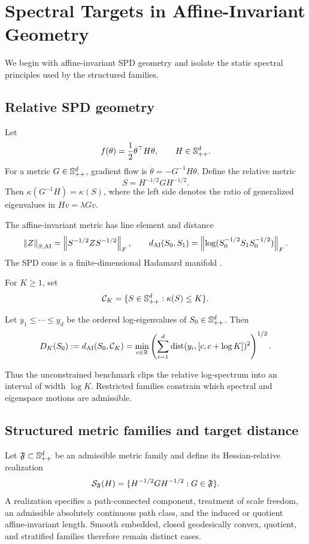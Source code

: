 \section{Spectral Targets in Affine-Invariant Geometry}
\label{sec:information-rdgc}

We begin with affine-invariant SPD geometry and isolate the static spectral
principles used by the structured families.

\subsection{Relative SPD geometry}

Let
\[
  f(\theta)=\frac12\theta^\top H\theta,
  \qquad H\in\mathbb S_{++}^d.
\]
For a metric \(G\in\mathbb S_{++}^d\), gradient flow is
\(\dot\theta=-G^{-1}H\theta\).  Define the relative metric
\[
  S=H^{-1/2}GH^{-1/2}.
\]
Then \(\kappa(G^{-1}H)=\kappa(S)\), where the left side denotes the ratio of
generalized eigenvalues in \(Hv=\lambda Gv\).

The affine-invariant metric has line element and distance
\[
  \left\lVert Z\right\rVert_{S,\mathrm{AI}}
  =\left\lVert S^{-1/2}ZS^{-1/2}\right\rVert_F,
  \qquad
  d_{\mathrm{AI}}(S_0,S_1)
  =\left\lVert \log(S_0^{-1/2}S_1S_0^{-1/2})\right\rVert_F.
\]
The SPD cone is a finite-dimensional Hadamard manifold
\cite{bhatia2007positive,pennec2006riemannian}.

For \(K\ge1\), set
\[
  \mathcal C_K=\{S\in\mathbb S_{++}^d:\kappa(S)\le K\}.
\]

\begin{theorem}
\label{thm:full-spd-benchmark}
Let \(y_1\le\cdots\le y_d\) be the ordered log-eigenvalues of
\(S_0\in\mathbb S_{++}^d\).  Then
\[
  D_K(S_0)
  :=d_{\mathrm{AI}}(S_0,\mathcal C_K)
  =
  \min_{c\in\mathbb R}
  \left(
  \sum_{i=1}^d\operatorname{dist}(y_i,[c,c+\log K])^2
  \right)^{1/2}.
\]
\end{theorem}

Thus the unconstrained benchmark clips the relative log-spectrum into an
interval of width \(\log K\).  Restricted families constrain which spectral
and eigenspace motions are admissible.

\subsection{Structured metric families and target distance}

Let \(\mathfrak F\subset\mathbb S_{++}^d\) be an admissible metric family and define its
Hessian-relative realization
\[
  \mathcal S_\mathfrak F(H)
  =
  \{H^{-1/2}GH^{-1/2}:G\in\mathfrak F\}.
\]
A realization specifies a path-connected component, treatment of scale
freedom, an admissible absolutely continuous path class, and the induced or
quotient affine-invariant length.  Smooth embedded, closed geodesically convex,
quotient, and stratified families therefore remain distinct cases.

